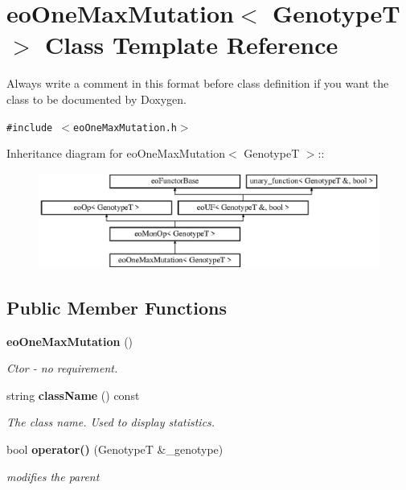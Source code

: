 \section{eo\-One\-Max\-Mutation$<$ Genotype\-T $>$ Class Template Reference}
\label{classeo_one_max_mutation}
Always write a comment in this format before class definition if you want the class to be documented by Doxygen.  


{\tt \#include $<$eo\-One\-Max\-Mutation.h$>$}

Inheritance diagram for eo\-One\-Max\-Mutation$<$ Genotype\-T $>$::\begin{figure}[H]
\begin{center}
\leavevmode
\includegraphics[height=3.15049cm]{classeo_one_max_mutation}
\end{center}
\end{figure}
\subsection*{Public Member Functions}
\begin{CompactItemize}
\item 
{\bf eo\-One\-Max\-Mutation} ()\label{classeo_one_max_mutation_a0}

\begin{CompactList}\small\item\em Ctor - no requirement. \item\end{CompactList}\item 
string {\bf class\-Name} () const \label{classeo_one_max_mutation_a1}

\begin{CompactList}\small\item\em The class name. Used to display statistics. \item\end{CompactList}\item 
bool {\bf operator()} (Genotype\-T \&\_\-genotype)
\begin{CompactList}\small\item\em modifies the parent \item\end{CompactList}\end{CompactItemize}


